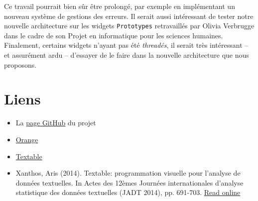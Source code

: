 \documentclass{article}
\begin{document}
Ce travail pourrait bien sûr être prolongé, par exemple en implémentant un nouveau système de gestions des erreurs. Il serait aussi intéressant de tester notre nouvelle architecture sur les widgets \texttt{Prototypes} retravaillés par Olivia Verbrugge dans le cadre de son Projet en informatique pour les sciences humaines. Finalement, certains widgets n'ayant pas été \textit{threadés}, il serait très intéressant – et assurément ardu – d'essayer de le faire dans la nouvelle architecture que nous proposons.

\section{Liens}

\begin{itemize}
    \item La \href{https://github.com/johancuda/rapport_projet_ISH_MA}{page GitHub} du projet
    \item \href{https://orangedatamining.com/}{Orange}
    \item \href{http://textable.io/}{Textable}
    \item Xanthos, Aris (2014). Textable: programmation visuelle pour l’analyse de données textuelles. In Actes des 12èmes Journées internationales d’analyse statistique des données textuelles (JADT 2014), pp. 691-703. \href{http://lexicometrica.univ-paris3.fr/jadt/jadt2014/01-ACTES/57-JADT2014.pdf}{Read online}
\end{itemize}
\end{document}
